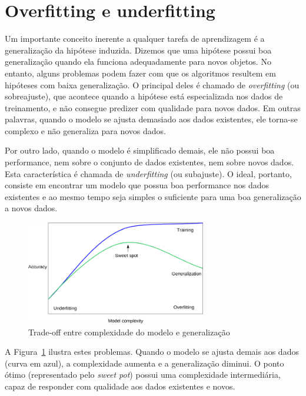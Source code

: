\section{Overfitting e underfitting}

Um importante conceito inerente a qualquer tarefa de aprendizagem é a generalização da hipótese induzida. Dizemos que uma hipótese possui boa generalização quando ela funciona adequadamente para novos objetos. No entanto, alguns problemas podem fazer com que os algoritmos resultem em hipóteses com baixa generalização. O principal deles é chamado de \textit{overfitting} (ou sobreajuste), que acontece quando a hipótese está especializada nos dados de treinamento, e não consegue predizer com qualidade para novos dados. Em outras palavras, quando o modelo se ajusta demasiado aos dados existentes, ele torna-se complexo e não generaliza para novos dados.

Por outro lado, quando o modelo é simplificado demais, ele não possui boa performance, nem sobre o conjunto de dados existentes, nem sobre novos dados. Esta característica é chamada de \textit{underfitting} (ou subajuste). O ideal, portanto, consiste em encontrar um modelo que possua boa performance nos dados existentes e ao mesmo tempo seja simples o suficiente para uma boa generalização a novos dados.

\begin{figure}[h]
	\centering
	\includegraphics[width=0.7\textwidth]{img/overfitting-underfitting}
	\caption{Trade-off entre complexidade do modelo e generalização}
	\label{fig:overfitting-underfitting}
\end{figure}

A Figura~\ref{fig:overfitting-underfitting} ilustra estes problemas. Quando o modelo se ajusta demais aos dados (curva em azul), a complexidade aumenta e a generalização diminui. O ponto ótimo (representado pelo \textit{sweet pot}) possui uma complexidade intermediária, capaz de responder com qualidade aos dados existentes e novos.

